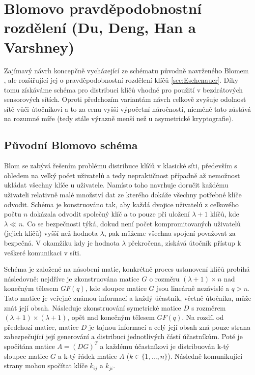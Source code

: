 \documentclass[11pt,final,twoside]{fithesis2}
\begin{document}
\section{Blomovo pravděpodobnostní rozdělení (Du, Deng, Han a Varshney)}
Zajímavý návrh \cite{Du2005} koncepčně vycházející ze schématu původně navrženého Blomem \cite{Blom1985}, ale rozšiřující jej o pravděpodobnostní rozdělení klíčů \ref{sec:Eschenauer}.
Díky tomu získáváme schéma pro distribuci klíčů vhodné pro použití v bezdrátových sensorových sítích. Oproti předchozím variantám návrh celkově zvyšuje odolnost sítě vůči 
útočníkovi a to za cenu vyšší výpočetní náročnosti, nicméně tato zůstává na rozumné míře (tedy stále výrazně menší než u asymetrické kryptografie). 

\subsection{Původní Blomovo schéma}
Blom \cite{Blom1985} se zabývá řešením problému distribuce klíčů v klasické síti, především s ohledem na velký počet uživatelů a tedy nepraktičnost případně až nemožnost ukládat všechny klíče u uživatele.
Namísto toho navrhuje doručit každému uživateli relativně malé množství dat ze kterého dokáže všechny potřebné klíče odvodit. Schéma je konstruováno tak, aby každá dvojice uživatelů z celkového počtu $n$
dokázala odvodit společný klíč a to pouze při uložení $\lambda + 1$ klíčů, kde $\lambda \ll n$. Co se bezpečnosti týká, dokud není počet kompromitovaných uživatelů (jejich klíčů) vyšší než hodnota 
$\lambda$, pak můžeme všechna spojení považovat za bezpečná. V okamžiku kdy je hodnota $\lambda$ překročena, získává útočník přístup k veškeré komunikaci v síti. 

Schéma je založené na násobení matic, konkrétně proces ustanovení klíčů probíhá následovně: 
nejdříve je zkonstruována matice $G$ o rozměru $(\lambda + 1) \times n$ nad konečným tělesem $GF(q)$, kde sloupce matice $G$ jsou lineárně nezávislé a $q > n$.
Tato matice je veřejně známou informací a každý účastník, včetně útočníka, může znát její obsah. Následuje zkonstruování symetrické matice $D$ s rozměrem $(\lambda + 1) \times (\lambda + 1) $, 
opět nad konečným tělesem $GF(q)$. Na rozdíl od předchozí matice, matice $D$ je tajnou informací a celý její obsah zná pouze strana zabezpečující její generování a distribuci jednotlivých částí 
účastníkům. Poté je spočítána matice $A= (DG)^T$ a každému účastníkovi je distribuován k-tý sloupec matice $G$ a k-tý řádek matice $A$ ($k \in \{1, \dots , n\}$). Následně komunikující strany
mohou spočítat klíče $k_{ij}$ a $k_{ji}$.  
\end{document}
